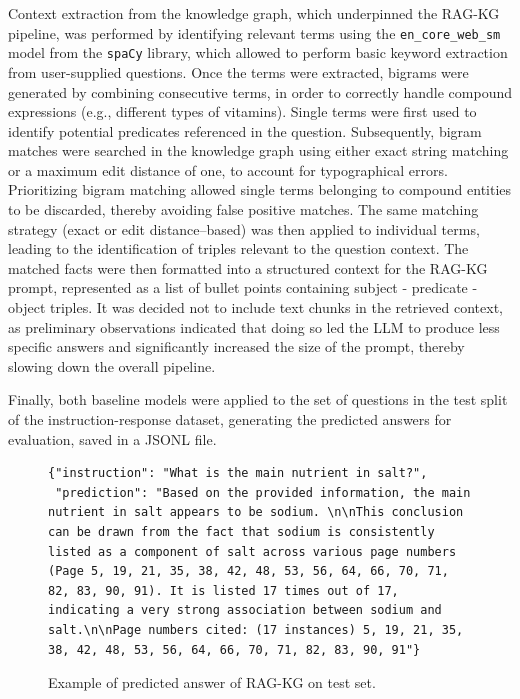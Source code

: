 Context extraction from the knowledge graph, which underpinned the RAG-KG pipeline, was performed by identifying relevant terms using the \texttt{en\_core\_web\_sm} model from the \texttt{spaCy} library, which allowed to perform basic keyword extraction from user-supplied questions. Once the terms were extracted, bigrams were generated by combining consecutive terms, in order to correctly handle compound expressions (e.g., different types of vitamins). Single terms were first used to identify potential predicates referenced in the question. Subsequently, bigram matches were searched in the knowledge graph using either exact string matching or a maximum edit distance of one, to account for typographical errors. Prioritizing bigram matching allowed single terms belonging to compound entities to be discarded, thereby avoiding false positive matches. The same matching strategy (exact or edit distance–based) was then applied to individual terms, leading to the identification of triples relevant to the question context. The matched facts were then formatted into a structured context for the RAG-KG prompt, represented as a list of bullet points containing subject - predicate - object triples.
It was decided not to include text chunks in the retrieved context, as preliminary observations indicated that doing so led the LLM to produce less specific answers and significantly increased the size of the prompt, thereby slowing down the overall pipeline.

Finally, both baseline models were applied to the set of questions in the test split of the instruction-response dataset, generating the predicted answers for evaluation, saved in a JSONL file.

\begin{figure}[h!]
\centering
\begin{lstlisting}
{"instruction": "What is the main nutrient in salt?",
 "prediction": "Based on the provided information, the main nutrient in salt appears to be sodium. \n\nThis conclusion can be drawn from the fact that sodium is consistently listed as a component of salt across various page numbers (Page 5, 19, 21, 35, 38, 42, 48, 53, 56, 64, 66, 70, 71, 82, 83, 90, 91). It is listed 17 times out of 17, indicating a very strong association between sodium and salt.\n\nPage numbers cited: (17 instances) 5, 19, 21, 35, 38, 42, 48, 53, 56, 64, 66, 70, 71, 82, 83, 90, 91"}
\end{lstlisting}
\caption{Example of predicted answer of RAG-KG on test set.}
\label{fig:RAG_example}
\end{figure}

